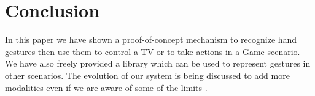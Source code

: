 \documentclass{llncs}
\begin{document}
\section*{Conclusion}
In this paper we have shown a proof-of-concept mechanism to recognize hand
gestures then use them to control a TV or to take actions in a Game scenario.
We have also freely provided a library which can be used to represent gestures
in other scenarios.
The evolution of our system is being discussed to add more modalities even if we
are aware of some of the limits \cite{Oviatt99tenmyths}.



\end{document}
